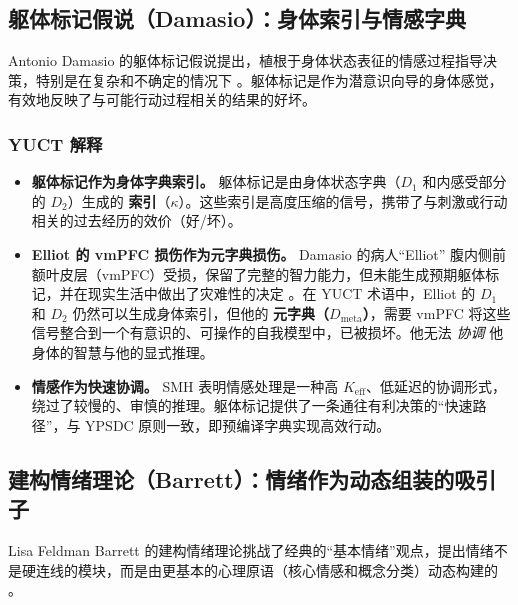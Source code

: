 \documentclass[12pt,a4paper]{article}
\begin{document}
	\subsection{躯体标记假说（Damasio）：身体索引与情感字典}
	
	Antonio Damasio 的躯体标记假说提出，植根于身体状态表征的情感过程指导决策，特别是在复杂和不确定的情况下 \cite{Damasio1994}。躯体标记是作为潜意识向导的身体感觉，有效地反映了与可能行动过程相关的结果的好坏。
	
	\subsubsection*{YUCT 解释}
	\begin{itemize}
		\item \textbf{躯体标记作为身体字典索引。} 躯体标记是由身体状态字典（$D_1$ 和内感受部分的 $D_2$）生成的 \textbf{索引}（$\kappa$）。这些索引是高度压缩的信号，携带了与刺激或行动相关的过去经历的效价（好/坏）。
		\item \textbf{Elliot 的 vmPFC 损伤作为元字典损伤。} Damasio 的病人“Elliot” 腹内侧前额叶皮层（vmPFC）受损，保留了完整的智力能力，但未能生成预期躯体标记，并在现实生活中做出了灾难性的决定 \cite{Damasio1994}。在 YUCT 术语中，Elliot 的 $D_1$ 和 $D_2$ 仍然可以生成身体索引，但他的 \textbf{元字典（$D_{\text{meta}}$）}，需要 vmPFC 将这些信号整合到一个有意识的、可操作的自我模型中，已被损坏。他无法 \textit{协调} 他身体的智慧与他的显式推理。
		\item \textbf{情感作为快速协调。} SMH 表明情感处理是一种高 $K_{\mathrm{eff}}$、低延迟的协调形式，绕过了较慢的、审慎的推理。躯体标记提供了一条通往有利决策的“快速路径”，与 YPSDC 原则一致，即预编译字典实现高效行动。
	\end{itemize}
	
	\subsection{建构情绪理论（Barrett）：情绪作为动态组装的吸引子}
	
	Lisa Feldman Barrett 的建构情绪理论挑战了经典的“基本情绪”观点，提出情绪不是硬连线的模块，而是由更基本的心理原语（核心情感和概念分类）动态构建的 \cite{Barrett2017}。
	
\end{document}
